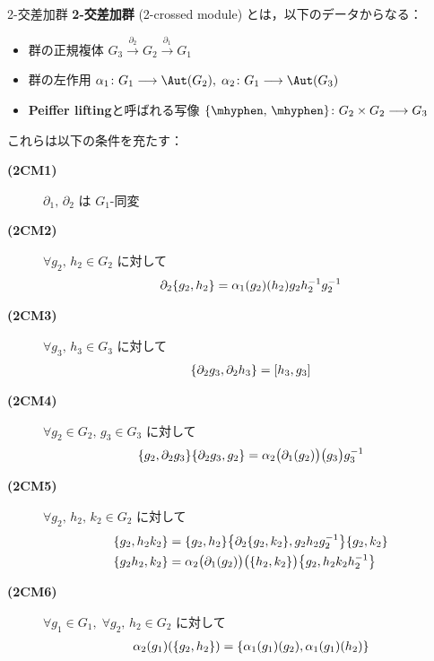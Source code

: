 \documentclass[TQFT_main]{subfiles}
\begin{document}
\begin{mydef}[label=def:2crossed]{2-交差加群}
    \textbf{2-交差加群} (2-crossed module) とは，以下のデータからなる：
    \begin{itemize}
        \item 群の正規複体 $G_3 \xrightarrow{\partial_2} G_2 \xrightarrow{\partial_1} G_1$
        \item 群の左作用 $\alpha_1 \colon G_1 \lto \Aut (G_2),\; \alpha_2 \colon G_1 \lto \Aut (G_3)$
        \item \textbf{Peiffer lifting}と呼ばれる写像 $\{\mhyphen,\, \mhyphen\} \colon G_2 \times G_2 \lto G_3$
    \end{itemize}
    これらは以下の条件を充たす：
    \begin{description}
        \item[\textbf{(2CM1)}] $\partial_1,\, \partial_2$ は $G_1$-同変
        \item[\textbf{(2CM2)}] $\forall g_2,\, h_2 \in G_2$ に対して
        \begin{align}
            \partial_2 \acomm{g_2}{h_2} = \alpha_1(g_2)(h_2) g_2 h_2^{-1} g_2^{-1}
        \end{align}
        
        \item[\textbf{(2CM3)}] $\forall g_3,\, h_3 \in G_3$ に対して
        \begin{align}
            \acomm{\partial_2 g_3}{\partial_2 h_3} = \comm{h_3}{g_3}
        \end{align}
        
        \item[\textbf{(2CM4)}] $\forall g_2 \in G_2,\, g_3 \in G_3$ に対して
        \begin{align}
            \acomm{g_2}{\partial_2 g_3} \acomm{\partial_2 g_3}{g_2} = \alpha_2 \bigl( \partial_1(g_2) \bigr) \bigl( g_3 \bigr) g_3^{-1}
        \end{align}

        \item[\textbf{(2CM5)}] $\forall g_2,\, h_2,\, k_2 \in G_2$ に対して
        \begin{align}
            \acomm{g_2}{h_2k_2} &= \acomm{g_2}{h_2} \acomm{\partial_2\acomm{g_2}{k_2}}{g_2 h_2 g_2^{-1}} \acomm{g_2}{k_2} \\
            \acomm{g_2h_2}{k_2} &= \alpha_2 \bigl( \partial_1(g_2) \bigr) \bigl( \acomm{h_2}{k_2} \bigr) \acomm{g_2}{h_2 k_2 h_2^{-1}}
        \end{align}
        
        \item[\textbf{(2CM6)}] $\forall g_1 \in G_1,\; \forall g_2,\, h_2 \in G_2$ に対して
        \begin{align}
            \alpha_2 (g_1)(\acomm{g_2}{h_2}) = \acomm{\alpha_1(g_1)(g_2)}{\alpha_1(g_1)(h_2)}
        \end{align}
    \end{description}
\end{mydef}
\end{document}
